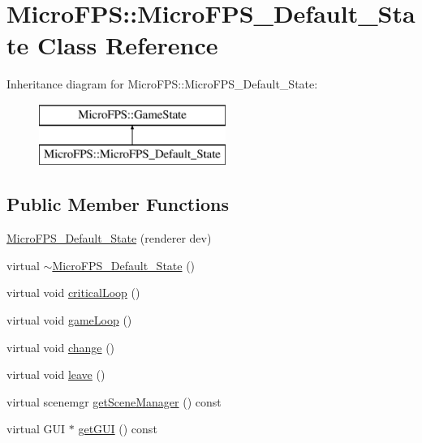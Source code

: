 \hypertarget{class_micro_f_p_s_1_1_micro_f_p_s___default___state}{
\section{MicroFPS::MicroFPS\_\-Default\_\-State Class Reference}
\label{db/df4/class_micro_f_p_s_1_1_micro_f_p_s___default___state}
}
Inheritance diagram for MicroFPS::MicroFPS\_\-Default\_\-State:\begin{figure}[H]
\begin{center}
\leavevmode
\includegraphics[height=2.000000cm]{db/df4/class_micro_f_p_s_1_1_micro_f_p_s___default___state}
\end{center}
\end{figure}
\subsection*{Public Member Functions}
\begin{DoxyCompactItemize}
\item 
\hyperlink{class_micro_f_p_s_1_1_micro_f_p_s___default___state_a83de89d96aeb0bd629d054e27012e69c}{MicroFPS\_\-Default\_\-State} (renderer dev)
\item 
virtual \hyperlink{class_micro_f_p_s_1_1_micro_f_p_s___default___state_a6fc332a98f5a195733a703513ed007db}{$\sim$MicroFPS\_\-Default\_\-State} ()
\item 
virtual void \hyperlink{class_micro_f_p_s_1_1_micro_f_p_s___default___state_ad1244341dd3c899b326eae64d9cf62a5}{criticalLoop} ()
\item 
virtual void \hyperlink{class_micro_f_p_s_1_1_micro_f_p_s___default___state_a5e1c596521adde8a507837984a91ea52}{gameLoop} ()
\item 
virtual void \hyperlink{class_micro_f_p_s_1_1_micro_f_p_s___default___state_a991dd2a5c3447ffbfc2a3273ecee3dde}{change} ()
\item 
virtual void \hyperlink{class_micro_f_p_s_1_1_micro_f_p_s___default___state_a153a9771384034079df9419872d0b730}{leave} ()
\item 
virtual scenemgr \hyperlink{class_micro_f_p_s_1_1_micro_f_p_s___default___state_abca8b7a177d52cdc1b722afb34e393e4}{getSceneManager} () const 
\item 
virtual GUI $\ast$ \hyperlink{class_micro_f_p_s_1_1_micro_f_p_s___default___state_acfac42fbdd87539dd9bf16a100304825}{getGUI} () const 
\end{DoxyCompactItemize}


